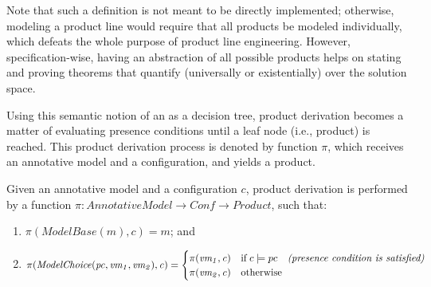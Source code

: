 Note that such a definition is not meant to be directly implemented; otherwise, modeling a product line would require that all products be modeled individually, which defeats the whole purpose of product line engineering.
However, specification-wise, having an abstraction of all possible products helps on stating and proving theorems that quantify (universally or existentially) over the solution space.

Using this semantic notion of an  as a decision tree, product derivation becomes a matter of evaluating presence conditions until a leaf node (i.e., product) is reached.
This product derivation process is denoted by function $\pi$, which receives an annotative model and a configuration, and yields a product.

\begin{definition}
\label{defn:pi}
Given an annotative model and a configuration $c$, product derivation is performed by a function $\mathit{\pi:AnnotativeModel \to Conf \to Product}$, such that:
\begin{enumerate}
    \item $\mathit{\pi(ModelBase(m),c) = m}$; and
    \item $\mathit{\pi(ModelChoice(pc,vm_1,vm_2),c)} = \begin{cases}
            \mathit{\pi(vm_1,c)} &\mbox{if} \; c \models pc  \quad \text{\textit{(presence condition is satisfied)}} \\
            \mathit{\pi(vm_2,c)} &\mbox{otherwise}
        \end{cases}$
\end{enumerate}

\end{definition} 

